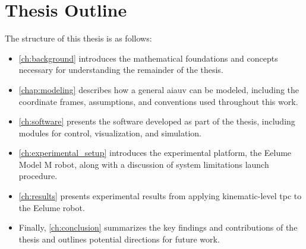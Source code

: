 
\newpage
\section{Thesis Outline}

The structure of this thesis is as follows:

\begin{itemize}
    \item \autoref{ch:background} introduces the mathematical foundations and concepts necessary for understanding the remainder of the thesis.
    \item \autoref{chap:modeling} describes how a general \gls{aiauv} can be modeled, including the coordinate frames, assumptions, and conventions used throughout this work. 
    \item \autoref{ch:software} presents the software developed as part of the thesis, including modules for control, visualization, and simulation.
    \item \autoref{ch:experimental_setup} introduces the experimental platform, the Eelume Model M robot, along with a discussion of system limitations launch procedure.
    \item \autoref{ch:results} presents experimental results from applying kinematic-level \gls{tpc} to the Eelume robot.
    \item Finally, \autoref{ch:conclusion} summarizes the key findings and contributions of the thesis and outlines potential directions for future work.
\end{itemize}

